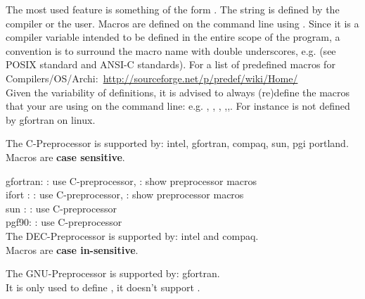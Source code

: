 \documentclass{article}
\begin{document}
The most used feature is something of the form .
The string  is defined by the compiler or the user.
Macros are defined on the command line using . Since it is a compiler variable intended to be defined in the entire scope of the program, a convention is to surround the macro name with double underscores, e.g.  (see POSIX standard and ANSI-C standards).
For a list of predefined macros for Compilers/OS/Archi:~\url{http://sourceforge.net/p/predef/wiki/Home/}\\
Given the variability of definitions, it is advised to always (re)define the macros that your are using on the command line: e.g. , , , ,,. For instance  is not defined by gfortran on linux.

The C-Preprocessor is supported by: intel, gfortran, compaq, sun, pgi portland.\\
Macros are \textbf{case sensitive}.

gfortran: 
: use C-preprocessor,
: show preprocessor macros\\
ifort :
: use C-preprocessor,
: show preprocessor macros\\
sun :
: use C-preprocessor\\
pgf90:
 : use C-preprocessor\\
%
The DEC-Preprocessor is supported by: intel and compaq.\\
Macros are \textbf{case in-sensitive}.

The GNU-Preprocessor is supported by: gfortran.\\
It is only used to define , it doesn't support .\\
\end{document}

